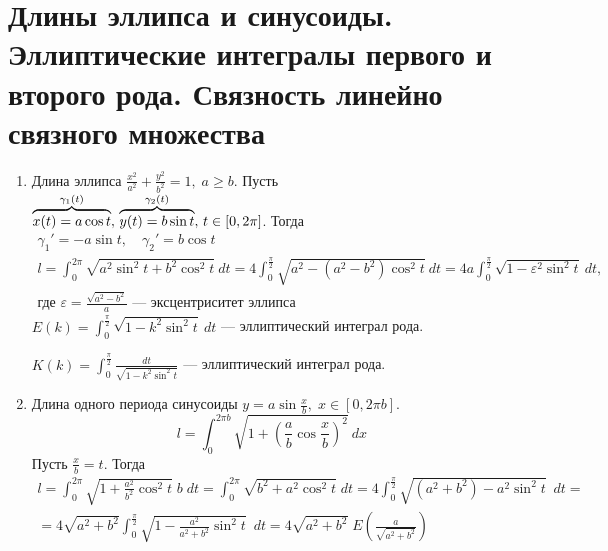 \section{Длины эллипса и синусоиды. Эллиптические интегралы первого и второго рода. Связность линейно связного множества}

\begin{examples}
  \begin{enumerate}
    \item Длина эллипса $\frac{x^2}{a^2} + \frac{y^2}{b^2} = 1, \; a \geq b$. Пусть $\overbrace{x(t) = a\cos t}^{\mathclap{\gamma_1(t)}}, \, \overbrace{y(t) = b\sin t}^{\mathclap{\gamma_2(t)}}, \, t \in [0, 2\pi]$. Тогда
    \begin{equation*}
      \begin{gathered}
        \gamma_1' = -a\sin t, \quad \gamma_2' = b \cos t \\
        l = \int_{0}^{2\pi}\sqrt{a^2\sin^2  t + b^2\cos^2 t} \: dt =
        4\int_{0}^{\frac{\pi}{2}}\sqrt{a^2 - (a^2 - b^2)\cos^2 t} \: dt
        = 4a\int_{0}^{\frac{\pi}{2}}\sqrt{1 - \varepsilon^2\sin^2 t} \: dt
        \text{,} \\ \text{где } \varepsilon = \frac{\sqrt{a^2 - b^2}}{a}\text{ --- эксцентриситет эллипса}
      \end{gathered}
    \end{equation*}
    $ \displaystyle
        E(k) = \int_{0}^{\frac{\pi}{2}}\sqrt{1 - k^2\sin^2 t} \: dt
    $ --- эллиптический интеграл  рода.

    $ \displaystyle
        K(k) = \int_{0}^{\frac{\pi}{2}} \frac{dt}{\sqrt{1 - k^2\sin^2 t}}
    $ --- эллиптический интеграл  рода.
    \item Длина одного периода синусоиды $y = a\sin \frac{x}{b}, \; x \in [0, 2\pi b]$.
    \begin{equation*}
      l = \int_{0}^{2\pi b}\sqrt{1 + \left(\frac{a}{b}\cos \frac{x}{b}\right)^2} \: dx
    \end{equation*}
    Пусть $\frac{x}{b} = t$. Тогда
    \begin{equation*}
      \begin{gathered}
        l = \int_{0}^{2\pi} \sqrt{1 + \frac{a^2}{b^2}\cos^2 t} \; b \; dt =
        \int_{0}^{2\pi} \sqrt{b^2 + a^2\cos^2 t} \; dt =
        4\int_{0}^{\frac{\pi}{2}}\sqrt{(a^2 + b^2) - a^2\sin^2 t} \; \: dt = \\
        = 4\sqrt{a^2 + b^2}\int_{0}^{\frac{\pi}{2}}\sqrt{1 - \frac{a^2}{a^2 + b^2}\sin^2 t} \; \: dt
        = 4\sqrt{a^2 + b^2} \; E\left(\frac{a}{\sqrt{a^2 + b^2}}\right)
      \end{gathered}
    \end{equation*}
  \end{enumerate}
\end{examples}

